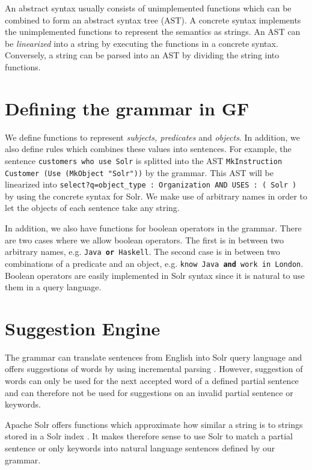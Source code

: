 \documentclass[10pt, a4paper]{article}
\begin{document}
An abstract syntax usually consists of unimplemented functions which can be combined to form an abstract syntax tree (AST). A concrete syntax implements the unimplemented functions to represent the semantics as strings. An AST can be \emph{linearized} into a string by executing the functions in a concrete syntax. Conversely, a string can be parsed into an AST by dividing the string into functions.

\section{Defining the grammar in GF}
We define functions to represent \emph{subjects, predicates} and \emph{objects}. In addition, we also define rules which combines these values into sentences. For example, the sentence \texttt{customers who use Solr} is splitted into the AST \texttt{MkInstruction Customer (Use (MkObject "Solr"))} by the grammar. This AST will be linearized into \texttt{select?q=object\_type : Organization AND USES : ( Solr )} by using the concrete syntax for Solr. We make use of arbitrary names in order to let the objects of each sentence take any string.

In addition, we also have functions for boolean operators in the grammar. There are two cases where we allow boolean operators. The first is in between two arbitrary names, e.g. \texttt{Java \textbf{or} Haskell}. The second case is in between two combinations of a predicate and an object, e.g. \texttt{know Java \textbf{and} work in London}. Boolean operators are easily implemented in Solr syntax since it is natural to use them in a query language.

\section{Suggestion Engine}
The grammar can translate sentences from English into Solr query language and offers suggestions of words by using incremental parsing \cite{angelov:2009}. However, suggestion of words can only be used for the next accepted word of a defined partial sentence and can therefore not be used for suggestions on an invalid partial sentence or keywords.

Apache Solr offers functions which approximate how similar a string is to strings stored in a Solr index \cite{kuc:2011}. It makes therefore sense to use Solr to match a partial sentence or only keywords into natural language sentences defined by our grammar.
\end{document}

